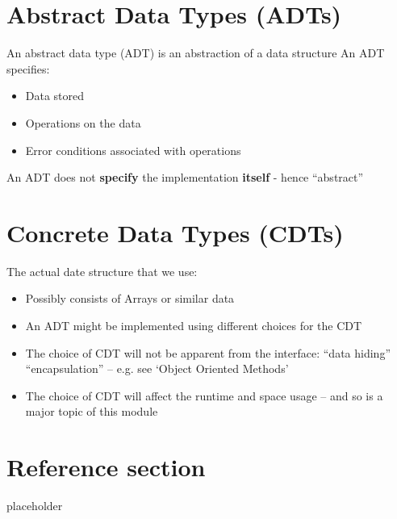 \documentclass{article}
\begin{document}
\section{Abstract Data Types (ADTs)}
\begin{flushleft}
An abstract data type (ADT) is an abstraction of a data structure
An ADT specifies:
\begin{itemize}
	\item Data stored
	\item Operations on the data
	\item Error conditions associated with operations
\end{itemize}
An ADT does not \textbf{specify} the implementation \textbf{itself} - hence “abstract”
\end{flushleft}

\section{Concrete Data Types (CDTs)}
\begin{flushleft}
The actual date structure that we use:
\begin{itemize}
	\item Possibly consists of Arrays or similar data
	\item An ADT might be implemented using different choices for the CDT
	\item The choice of CDT will not be apparent from the interface: “data hiding” “encapsulation” – e.g. see ‘Object Oriented Methods’
	\item The choice of CDT will affect the runtime and space usage – and so is a major topic of this module
\end{itemize}
\end{flushleft}

\pagebreak
\section*{Reference section} \label{sec:reference}
\begin{description}
	\item[placeholder] \hfill \\
\end{description}
\end{document}
